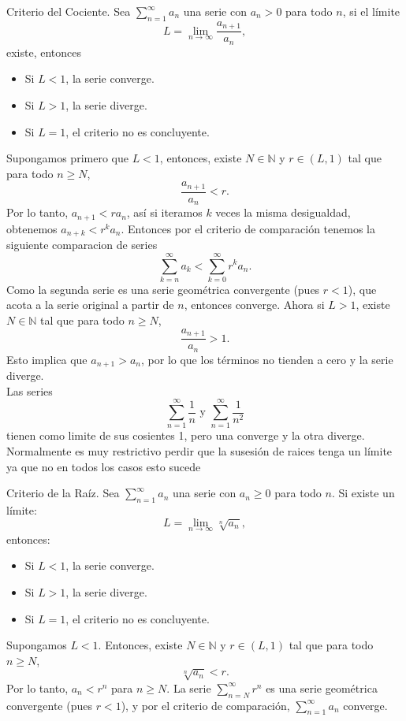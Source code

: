 \documentclass[main.tex]{subfiles}
\begin{document}
\begin{prop}{Criterio del Cociente.}
Sea \(\sum_{n=1}^\infty a_n\) una serie con \(a_n > 0\) para todo \(n\), si el límite
\[
L = \lim_{n \to \infty} \frac{a_{n+1}}{a_n},
\]
existe, entonces
\begin{itemize}
\item Si \(L < 1\), la serie converge.
\item Si \(L > 1\), la serie diverge.
\item Si \(L = 1\), el criterio no es concluyente.
\end{itemize}
\end{prop}
\dem Supongamos primero que \(L < 1\), entonces, existe \(N \in \mathbb{N}\) y \(r \in (L, 1)\) tal que para todo \(n \geq N\),
\[
\frac{a_{n+1}}{a_n} < r.
\]
Por lo tanto, \(a_{n+1} < r a_n\), así si iteramos \(k\) veces la misma desigualdad, obtenemos \(a_{n+k} < r^k a_n\).
Entonces por el criterio de comparación tenemos la siguiente  comparacion de series
\[
    \sum_{k=n}^\infty a_k<\sum_{k=0}^\infty r^k a_n.
    \]
Como la segunda serie es una serie geométrica convergente (pues \(r < 1\)), que acota a la serie original a partir de \(n\), entonces converge.
Ahora si \(L > 1\), existe \(N \in \mathbb{N}\) tal que para todo \(n \geq N\),
\[
\frac{a_{n+1}}{a_n} > 1.
\]
Esto implica que \(a_{n+1} > a_n\), por lo que los términos no tienden a cero y la serie diverge.
\QED\\
\eje Las series
\[
\sum_{n=1}^{\infty}\frac{1}{n}\text{ y }\sum_{n=1}^{\infty}\frac{1}{n^2}
\]
tienen como limite de sus cosientes 1, pero una converge y la otra diverge.
Normalmente es muy restrictivo perdir que la susesión de raices tenga un límite ya que no en todos los casos esto sucede
\begin{prop}{Criterio de la Raíz.}
Sea \(\sum_{n=1}^\infty a_n\) una serie con \(a_n \geq 0\) para todo \(n\). Si existe un límite:
\[
L = \lim_{n \to \infty} \sqrt[n]{a_n},
\]
entonces:
\begin{itemize}
    \item Si \(L < 1\), la serie converge.
    \item Si \(L > 1\), la serie diverge.
    \item Si \(L = 1\), el criterio no es concluyente.
\end{itemize}
\end{prop}
\dem Supongamos \(L < 1\). Entonces, existe \(N \in \mathbb{N}\) y \(r \in (L, 1)\) tal que para todo \(n \geq N\),
\[
\sqrt[n]{a_n} < r.
\]
Por lo tanto, \(a_n < r^n\) para \(n \geq N\). La serie \(\sum_{n=N}^\infty r^n\) es una serie geométrica convergente (pues \(r < 1\)), y por el criterio de comparación, \(\sum_{n=1}^\infty a_n\) converge.
\end{document}
